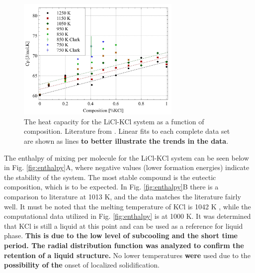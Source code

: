 \documentclass[review]{elsarticle}
\providecommand{\DIFaddtex}[1]{{\bf #1}} %
\providecommand{\DIFdeltex}[1]{} %
\providecommand{\DIFaddbegin}{\protect\color{blue}} %
\providecommand{\DIFaddend}{\protect\color{black}} %
\providecommand{\DIFdelbegin}{\protect\color{red}} %
\providecommand{\DIFdelend}{\protect\color{black}} %
\providecommand{\DIFaddFL}[1]{\DIFadd{#1}} %
\providecommand{\DIFdelFL}[1]{\DIFdel{#1}} %
\providecommand{\DIFaddbeginFL}{} %
\providecommand{\DIFaddendFL}{} %
\providecommand{\DIFdelbeginFL}{} %
\providecommand{\DIFdelendFL}{} %
\providecommand{\DIFadd}[1]{\texorpdfstring{\DIFaddtex{#1}}{#1}} %
\providecommand{\DIFdel}[1]{\texorpdfstring{\DIFdeltex{#1}}{}} %
\newcommand{\DIFscaledelfig}{0.5}
\newlength{\DIFdelgraphicswidth} %
\newlength{\DIFdelgraphicsheight} %
\newcommand{\DIFaddincludegraphics}[2][]{{\color{blue}\fbox{\DIFOincludegraphics[#1]{#2}}}} %
\newcommand{\DIFdelincludegraphics}[2][]{%
\sbox{\DIFdelgraphicsbox}{\DIFOincludegraphics[#1]{#2}}%
\settoboxwidth{\DIFdelgraphicswidth}{\DIFdelgraphicsbox} %
\settoboxtotalheight{\DIFdelgraphicsheight}{\DIFdelgraphicsbox} %
\scalebox{\DIFscaledelfig}{%
\parbox[b]{\DIFdelgraphicswidth}{\usebox{\DIFdelgraphicsbox}\\[-\baselineskip] \rule{\DIFdelgraphicswidth}{0em}}\llap{\resizebox{\DIFdelgraphicswidth}{\DIFdelgraphicsheight}{%
\setlength{\unitlength}{\DIFdelgraphicswidth}%
\begin{picture}(1,1)%
\thicklines\linethickness{2pt} %
{\color[rgb]{1,0,0}\put(0,0){\framebox(1,1){}}}%
{\color[rgb]{1,0,0}\put(0,0){\line( 1,1){1}}}%
{\color[rgb]{1,0,0}\put(0,1){\line(1,-1){1}}}%
\end{picture}%
}\hspace*{3pt}}} %
} %
\DeclareRobustCommand{\DIFaddbegin}{\DIFOaddbegin \let\includegraphics\DIFaddincludegraphics} %
\DeclareRobustCommand{\DIFaddend}{\DIFOaddend \let\includegraphics\DIFOincludegraphics} %
\DeclareRobustCommand{\DIFdelbegin}{\DIFOdelbegin \let\includegraphics\DIFdelincludegraphics} %
\DeclareRobustCommand{\DIFdelend}{\DIFOaddend \let\includegraphics\DIFOincludegraphics} %
\DeclareRobustCommand{\DIFaddbeginFL}{\DIFOaddbeginFL \let\includegraphics\DIFaddincludegraphics} %
\DeclareRobustCommand{\DIFaddendFL}{\DIFOaddendFL \let\includegraphics\DIFOincludegraphics} %
\DeclareRobustCommand{\DIFdelbeginFL}{\DIFOdelbeginFL \let\includegraphics\DIFdelincludegraphics} %
\DeclareRobustCommand{\DIFdelendFL}{\DIFOaddendFL \let\includegraphics\DIFOincludegraphics} %
\begin{document}
\begin{figure}[h]
 \centering
 \DIFdelbeginFL %
\DIFdelendFL \DIFaddbeginFL \includegraphics[width=0.7\textwidth]{images/cp.jpg} 
 \DIFaddendFL \caption{The heat capacity for the LiCl-KCl system as a function of composition. Literature from \DIFdelbeginFL \DIFdelFL{\cite{Janz1974}}\DIFdelendFL \DIFaddbeginFL \DIFaddFL{\cite{janz1975molten,clark1973}}\DIFaddendFL . Linear fits to each complete data set are shown as lines \DIFaddbeginFL \DIFaddFL{to better illustrate the trends in the data}\DIFaddendFL . }
 \label{fig:cp}   
\end{figure} 

\FloatBarrier

The enthalpy of mixing per molecule for the LiCl-KCl system can be seen below in Fig. \ref{fig:enthalpy}A, where negative values (lower formation energies) indicate the stability of the system. The most stable compound is the eutectic composition, which is to be expected. In Fig. \ref{fig:enthalpy}B there is a comparison to literature \cite{hersh1965enthalpies} at 1013 K, and the data matches the literature fairly well. It must be noted that the melting temperature of KCl is 1042 K \cite{Zhou2020}, while the computational data utilized in Fig. \ref{fig:enthalpy} is at 1000 K. It was determined that KCl is still a liquid at this point and can be used as a reference for liquid phase. \DIFaddbegin \DIFadd{This is due to the low level of subcooling and the short time period. The radial distribution function was analyzed to confirm the retention of a liquid structure. }\DIFaddend No lower temperatures \DIFdelbegin \DIFdel{could be }\DIFdelend \DIFaddbegin \DIFadd{were }\DIFaddend used due to the \DIFaddbegin \DIFadd{possibility of the }\DIFaddend onset of localized solidification.
\end{document}
